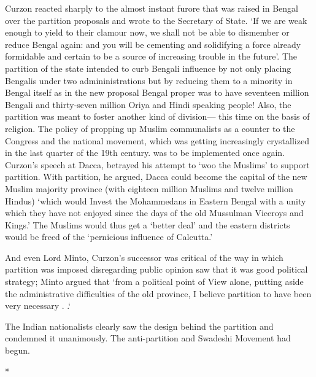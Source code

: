 Curzon reacted sharply to the almost instant furore that was raised in Bengal over the partition proposals and wrote to the Secretary of State. `If we are weak enough to yield to their clamour now, we shall not be able to dismember or reduce Bengal again: and you will be cementing and solidifying a force already formidable and certain to be a source of increasing trouble in the future'. The partition of the state intended to curb Bengali influence by not only placing Bengalis under two admininistrations but by reducing them to a minority in Bengal itself as in the new proposal Bengal proper was to have seventeen million Bengali and thirty-seven million Oriya and Hindi speaking people! Also, the partition was meant to foster another kind of division— this time on the basis of religion. The policy of propping up Muslim communalists as a counter to the Congress and the national movement, which was getting increasingly crystallized in the last quarter of the 19th century. was to be implemented once again. Curzon's speech at Dacca, betrayed his attempt to `woo the Muslims' to support partition. With partition, he argued, Dacca could become the capital of the new Muslim majority province (with eighteen million Muslims and twelve million Hindus) `which would Invest the Mohammedans in Eastern Bengal with a unity which they have not enjoyed since the days of the old Mussulman Viceroys and Kings.' The Muslims would thus get a `better deal' and the eastern districts would be freed of the `pernicious influence of Calcutta.'

And even Lord Minto, Curzon's successor was critical of the way in which partition was imposed disregarding public opinion saw that it was good political strategy; Minto argued that `from a political point of View alone, putting aside the administrative difficulties of the old province, I believe partition to have been very necessary . .`

The Indian nationalists clearly saw the design behind the partition and condemned it unanimously. The anti-partition and Swadeshi Movement had begun.

\begin{center}*\end{center}

\paragraph*{}


